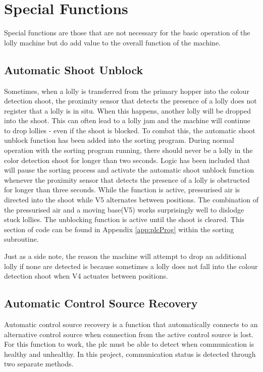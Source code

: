 \section{Special Functions}
    Special functions are those that are not necessary for the basic operation of the lolly machine but do add value to the overall function of the machine.

    \subsection{Automatic Shoot Unblock}
        Sometimes, when a lolly is transferred from the primary hopper into the colour detection shoot, the proximity sensor that detects the presence of a lolly does not register that a lolly is in situ. When this happens, another lolly will be dropped into the shoot. This can often lead to a lolly jam and the machine will continue to drop lollies - even if the shoot is blocked. To combat this, the automatic shoot unblock function has been added into the sorting program. 
        During normal operation with the sorting program running, there should never be a lolly in the color detection shoot for longer than two seconds. 
        Logic has been included that will pause the sorting process and activate the automatic shoot unblock function whenever the proximity sensor that detects the presence of a lolly is obstructed for longer than three seconds. While the function is active, pressurised air is directed into the shoot while V5 alternates between positions. The combination of the pressurised air and a moving base(V5) works surprisingly well to dislodge stuck lollies. The unblocking function is active until the shoot is cleared. This section of code can be found in Appendix \ref{app:plcProg} within the sorting subroutine. 
        
        Just as a side note, the reason the machine will attempt to drop an additional lolly if none are detected is because sometimes a lolly does not fall into the colour detection shoot when V4 actuates between positions. 

    \subsection{Automatic Control Source Recovery} \label{sec:autoConRec}
        Automatic control source recovery is a function that automatically connects to an alternative control source when connection from the active control source is lost. For this function to work, the \acrshort{plc} must be able to detect when communication is healthy and unhealthy. In this project, communication status is detected through two separate methods. 

